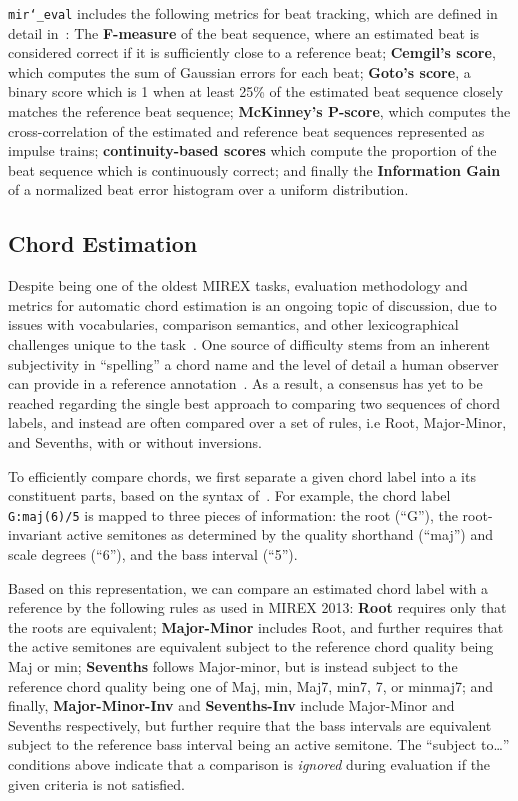 \documentclass{article}
\def\mireval{\texttt{mir\char`_eval}}
\begin{document}
\mireval{} includes the following metrics for beat tracking, which are defined in
detail in~\cite{davies2009evaluation}:
The \textbf{F-measure} of the beat sequence, where an estimated beat is considered correct if it is sufficiently close to a reference beat;
\textbf{Cemgil's score}, which computes the sum of Gaussian errors for each beat;
\textbf{Goto's score}, a binary score which is 1 when at least 25\% of the estimated beat sequence closely matches the reference beat sequence;
\textbf{McKinney's P-score}, which computes the cross-correlation of the estimated and reference beat sequences represented as impulse trains;
\textbf{continuity-based scores} which compute the proportion of the beat sequence which is continuously correct;
and finally the \textbf{Information Gain} of a normalized beat error histogram over a uniform distribution.

\subsection{Chord Estimation}

Despite being one of the oldest MIREX tasks, evaluation methodology and metrics for
automatic chord estimation is an ongoing topic of discussion, due to issues with
vocabularies, comparison semantics, and other lexicographical challenges unique to the
task~\cite{pauwels2013evaluating}.
One source of difficulty stems from an inherent subjectivity in ``spelling'' a chord
name and the level of detail a human observer can provide in a reference annotation~\cite{ni2013understanding}.
As a result, a consensus has yet to be reached regarding the single best approach to comparing two sequences of chord labels, and instead are often compared over a set of rules, i.e Root, Major-Minor, and Sevenths, with or without inversions.

To efficiently compare chords, we first separate a given chord label into a its
constituent parts, based on the syntax of~\cite{harte2010towards}.
For example, the chord label \texttt{G:maj(6)/5} is mapped to three pieces of information: the root (``G''), the root-invariant active semitones as determined by the quality shorthand (``maj'') and scale degrees (``6''), and the bass interval (``5'').

Based on this representation, we can compare an estimated chord label with a reference by the following rules as used in MIREX 2013\cite{choi2013mirex}:
\textbf{Root} requires only that the roots are equivalent;
\textbf{Major-Minor} includes Root, and further requires that the active semitones are equivalent subject to the reference chord quality being Maj or min;
\textbf{Sevenths} follows Major-minor, but is instead subject to the reference chord quality being one of Maj, min, Maj7, min7, 7, or minmaj7;
and finally, \textbf{Major-Minor-Inv} and \textbf{Sevenths-Inv} include Major-Minor and Sevenths respectively, but further require that the bass intervals are equivalent subject to the reference bass interval being an active semitone.
The ``subject to\ldots'' conditions above indicate that a comparison is \emph{ignored} during evaluation if the given criteria is not satisfied.
\end{document}
